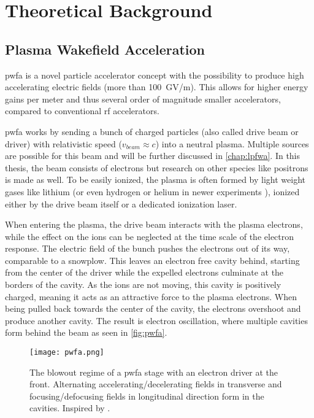 \documentclass[bachelor_thesis]{subfiles}
\begin{document}
\chapter{Theoretical Background} \label{chap:theory}
\section{Plasma Wakefield Acceleration}
\Gls{pwfa} is a novel particle accelerator concept \cite{Chen1985} with the possibility to produce high accelerating electric fields (more than \qty{100}{\giga\volt/\m}). This allows for higher energy gains per meter
and thus several order of magnitude smaller accelerators, compared to conventional \gls{rf} accelerators.

\Gls{pwfa} works by sending a bunch of charged particles (also called drive beam or driver) with relativistic speed ($v_{beam}\approx c$) into a neutral plasma. Multiple sources are possible for this beam and will be further discussed in \autoref{chap:lpfwa}.
In this thesis, the beam consists of electrons but research on other species like positrons \cite{Gessner2016} is made as well. To be easily ionized, the plasma is often formed by light weight gases like lithium (or even hydrogen or helium in newer experiments \cite{Schoebel2022}), 
ionized either by the drive beam itself or a dedicated ionization laser.

When entering the plasma, the drive beam interacts with the plasma electrons, while the effect on the ions can be neglected at the time scale of the electron response. The electric field of the bunch pushes the electrons out of its way, comparable to a snowplow. 
This leaves an electron free cavity behind, starting from the center of the driver while the expelled electrons culminate at the borders of the cavity. As the ions are not moving, this cavity is positively charged, meaning it acts as an attractive force to the plasma electrons.
When being pulled back towards the center of the cavity, the electrons overshoot and produce another cavity. The result is electron oscillation, where multiple cavities form behind the beam as seen in \autoref{fig:pwfa}.

\begin{figure}
	\centering
	\texttt{[image: pwfa.png]}
	\caption{The blowout regime of a \gls{pwfa} stage with an electron driver at the front. Alternating accelerating/decelerating fields in transverse and focusing/defocusing fields in longitudinal direction form in the cavities. Inspired by \cite{Kurz2020}.}
	\label{fig:pwfa} 
\end{figure}
\end{document}
